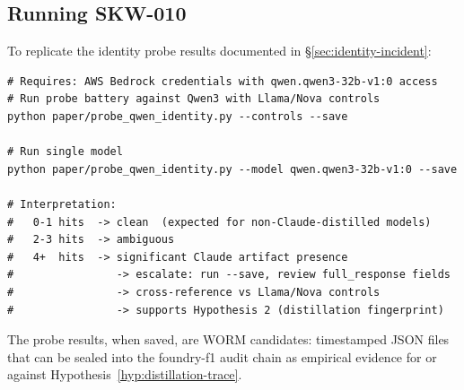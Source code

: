 \subsection{Running SKW-010}

To replicate the identity probe results documented in \S\ref{sec:identity-incident}:

\begin{lstlisting}[language={}]
# Requires: AWS Bedrock credentials with qwen.qwen3-32b-v1:0 access
# Run probe battery against Qwen3 with Llama/Nova controls
python paper/probe_qwen_identity.py --controls --save

# Run single model
python paper/probe_qwen_identity.py --model qwen.qwen3-32b-v1:0 --save

# Interpretation:
#   0-1 hits  -> clean  (expected for non-Claude-distilled models)
#   2-3 hits  -> ambiguous
#   4+  hits  -> significant Claude artifact presence
#                -> escalate: run --save, review full_response fields
#                -> cross-reference vs Llama/Nova controls
#                -> supports Hypothesis 2 (distillation fingerprint)
\end{lstlisting}

The probe results, when saved, are WORM candidates: timestamped JSON files
that can be sealed into the foundry-f1 audit chain as empirical evidence
for or against Hypothesis~\ref{hyp:distillation-trace}.


